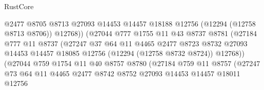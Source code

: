 \begin{lexlean}{RustCore}
\begin{coremodule}
                                    @2477
                                    @8705
                                    @8713
                                    @27093
                                    @14453
                                    @14457
                                    @18188
                                    @12756
                                    (@12294 (@12758 @8713 @8706))
                                    @12768))
                                (@27044
                                  @777
                                  @1755
                                  @11
                                  @43
                                  @8737
                                  @8781
                                  (@27184
                                    @777
                                    @11
                                    @8737
                                    (@27247
                                      @37
                                      @64
                                      @11
                                      @4465
                                      @2477
                                      @8723
                                      @8732
                                      @27093
                                      @14453
                                      @14457
                                      @18085
                                      @12756
                                      (@12294 (@12758 @8732 @8724))
                                      @12768))
                                  (@27044
                                    @759
                                    @1754
                                    @11
                                    @40
                                    @8757
                                    @8780
                                    (@27184
                                      @759
                                      @11
                                      @8757
                                      (@27247
                                        @73
                                        @64
                                        @11
                                        @4465
                                        @2477
                                        @8742
                                        @8752
                                        @27093
                                        @14453
                                        @14457
                                        @18011
                                        @12756

\end{coremodule}
\end{lexlean}
